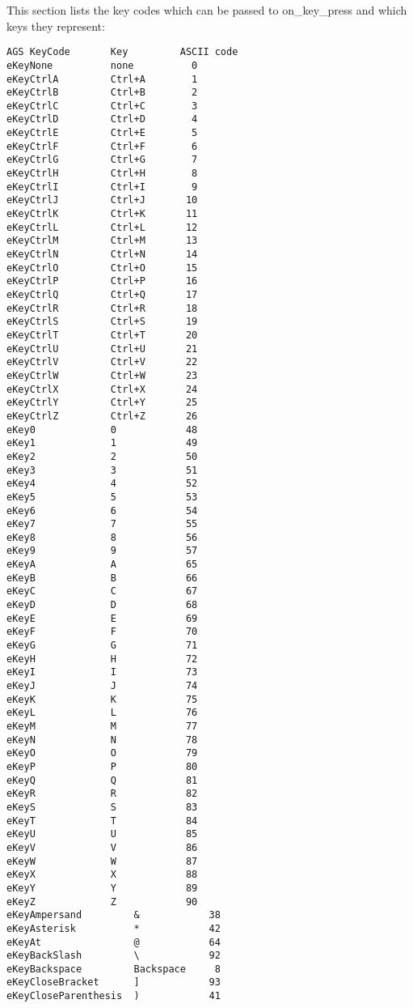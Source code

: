 This section lists the key codes which can be passed to  on_key_press  and
which keys they represent:
\begin{verbatim}
AGS KeyCode       Key         ASCII code
eKeyNone          none          0
eKeyCtrlA         Ctrl+A        1
eKeyCtrlB         Ctrl+B        2
eKeyCtrlC         Ctrl+C        3
eKeyCtrlD         Ctrl+D        4
eKeyCtrlE         Ctrl+E        5
eKeyCtrlF         Ctrl+F        6
eKeyCtrlG         Ctrl+G        7
eKeyCtrlH         Ctrl+H        8
eKeyCtrlI         Ctrl+I        9
eKeyCtrlJ         Ctrl+J       10
eKeyCtrlK         Ctrl+K       11
eKeyCtrlL         Ctrl+L       12
eKeyCtrlM         Ctrl+M       13
eKeyCtrlN         Ctrl+N       14
eKeyCtrlO         Ctrl+O       15
eKeyCtrlP         Ctrl+P       16
eKeyCtrlQ         Ctrl+Q       17
eKeyCtrlR         Ctrl+R       18
eKeyCtrlS         Ctrl+S       19
eKeyCtrlT         Ctrl+T       20
eKeyCtrlU         Ctrl+U       21
eKeyCtrlV         Ctrl+V       22
eKeyCtrlW         Ctrl+W       23
eKeyCtrlX         Ctrl+X       24
eKeyCtrlY         Ctrl+Y       25
eKeyCtrlZ         Ctrl+Z       26
eKey0             0            48
eKey1             1            49
eKey2             2            50
eKey3             3            51
eKey4             4            52
eKey5             5            53
eKey6             6            54
eKey7             7            55
eKey8             8            56
eKey9             9            57
eKeyA             A            65
eKeyB             B            66
eKeyC             C            67
eKeyD             D            68
eKeyE             E            69
eKeyF             F            70
eKeyG             G            71
eKeyH             H            72
eKeyI             I            73
eKeyJ             J            74
eKeyK             K            75
eKeyL             L            76
eKeyM             M            77
eKeyN             N            78
eKeyO             O            79
eKeyP             P            80
eKeyQ             Q            81
eKeyR             R            82
eKeyS             S            83
eKeyT             T            84
eKeyU             U            85
eKeyV             V            86
eKeyW             W            87
eKeyX             X            88
eKeyY             Y            89
eKeyZ             Z            90
eKeyAmpersand         &            38
eKeyAsterisk          *            42
eKeyAt                @            64
eKeyBackSlash         \            92
eKeyBackspace         Backspace     8
eKeyCloseBracket      ]            93
eKeyCloseParenthesis  )            41

\end{verbatim}
